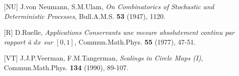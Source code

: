 \item{[NU]} J.von Neumann, S.M.Ulam, {\it On Combinatorics of Stochastic and
            Deterministic Processes}, Bull.A.M.S. {\bf 53} (1947), 1120.

\item{[R]}  D.Ruelle, {\it Applications Conservants une mesure absolutement 
            continu par rapport \`a $dx$ sur $[0,1]$}, Commun.Math.Phys. 
            {\bf 55} (1977), 47-51.

\item{[VT]} J.J.P.Veerman, F.M.Tangerman, {\it Scalings in Circle Maps (I)},
            Commun.Math.Phys. {\bf 134} (1990), 89-107. 



 


